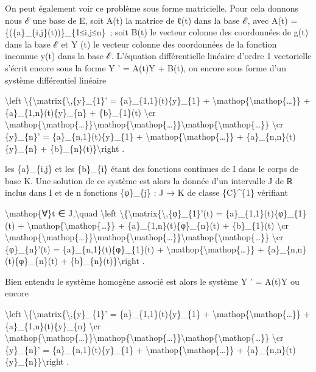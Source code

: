 \documentclass[]{article}
\begin{document}
On peut également voir ce problème sous forme matricielle. Pour cela
donnons nous ℰ une base de E, soit A(t) la matrice de ℓ(t) dans la base
ℰ, avec A(t) = \{(\{a\}\_\{i,j\}(t))\}\_\{1≤i,j≤n\}~; soit B(t) le
vecteur colonne des coordonnées de g(t) dans la base ℰ et Y (t) le
vecteur colonne des coordonnées de la fonction inconnue y(t) dans la
base ℰ. L'équation différentielle linéaire d'ordre 1 vectorielle s'écrit
encore sous la forme Y ' = A(t)Y + B(t), ou encore sous forme d'un
système différentiel linéaire

\textbackslash{}left
\textbackslash{}\{\textbackslash{}matrix\{\textbackslash{},\{y\}\_\{1\}'
= \{a\}\_\{1,1\}(t)\{y\}\_\{1\} +
\textbackslash{}mathop\{\textbackslash{}mathop\{\ldots{}\}\} +
\{a\}\_\{1,n\}(t)\{y\}\_\{n\} + \{b\}\_\{1\}(t) \textbackslash{}cr
\textbackslash{}mathop\{\textbackslash{}mathop\{\ldots{}\}\}\textbackslash{}mathop\{\textbackslash{}mathop\{\ldots{}\}\}\textbackslash{}mathop\{\textbackslash{}mathop\{\ldots{}\}\}
\textbackslash{}cr \{y\}\_\{n\}' = \{a\}\_\{n,1\}(t)\{y\}\_\{1\} +
\textbackslash{}mathop\{\textbackslash{}mathop\{\ldots{}\}\} +
\{a\}\_\{n,n\}(t)\{y\}\_\{n\} + \{b\}\_\{n\}(t)\}\textbackslash{}right .

les \{a\}\_\{i,j\} et les \{b\}\_\{i\} étant des fonctions continues de
I dans le corps de base K. Une solution de ce système est alors la
donnée d'un intervalle J de ℝ inclus dans I et de n fonctions
\{φ\}\_\{j\} : J → K de classe \{C\}\^{}\{1\} vérifiant

\textbackslash{}mathop\{∀\}t ∈ J,\textbackslash{}quad
\textbackslash{}left
\textbackslash{}\{\textbackslash{}matrix\{\textbackslash{},\{φ\}\_\{1\}'(t)
= \{a\}\_\{1,1\}(t)\{φ\}\_\{1\}(t) +
\textbackslash{}mathop\{\textbackslash{}mathop\{\ldots{}\}\} +
\{a\}\_\{1,n\}(t)\{φ\}\_\{n\}(t) + \{b\}\_\{1\}(t) \textbackslash{}cr
\textbackslash{}mathop\{\textbackslash{}mathop\{\ldots{}\}\}\textbackslash{}mathop\{\textbackslash{}mathop\{\ldots{}\}\}\textbackslash{}mathop\{\textbackslash{}mathop\{\ldots{}\}\}
\textbackslash{}cr \{φ\}\_\{n\}'(t) = \{a\}\_\{n,1\}(t)\{φ\}\_\{1\}(t) +
\textbackslash{}mathop\{\textbackslash{}mathop\{\ldots{}\}\} +
\{a\}\_\{n,n\}(t)\{φ\}\_\{n\}(t) +
\{b\}\_\{n\}(t)\}\textbackslash{}right .

Bien entendu le système homogène associé est alors le système Y ' =
A(t)Y ou encore

\textbackslash{}left
\textbackslash{}\{\textbackslash{}matrix\{\textbackslash{},\{y\}\_\{1\}'
= \{a\}\_\{1,1\}(t)\{y\}\_\{1\} +
\textbackslash{}mathop\{\textbackslash{}mathop\{\ldots{}\}\} +
\{a\}\_\{1,n\}(t)\{y\}\_\{n\} \textbackslash{}cr
\textbackslash{}mathop\{\textbackslash{}mathop\{\ldots{}\}\}\textbackslash{}mathop\{\textbackslash{}mathop\{\ldots{}\}\}\textbackslash{}mathop\{\textbackslash{}mathop\{\ldots{}\}\}
\textbackslash{}cr \{y\}\_\{n\}' = \{a\}\_\{n,1\}(t)\{y\}\_\{1\} +
\textbackslash{}mathop\{\textbackslash{}mathop\{\ldots{}\}\} +
\{a\}\_\{n,n\}(t)\{y\}\_\{n\}\}\textbackslash{}right .
\end{document}
